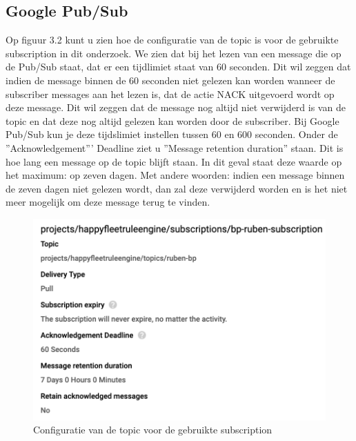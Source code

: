 \subsection{Google Pub/Sub}
Op figuur 3.2 kunt u zien hoe de configuratie van de topic is voor de gebruikte subscription in dit onderzoek. We zien dat bij het lezen van een message die op de Pub/Sub staat, dat er een tijdlimiet staat van 60 seconden. Dit wil zeggen dat indien de message binnen de 60 seconden niet gelezen kan worden wanneer de subscriber messages aan het lezen is, dat de actie NACK uitgevoerd wordt op deze message. Dit wil zeggen dat de message nog altijd niet verwijderd is van de topic en dat deze nog altijd gelezen kan worden door de subscriber. Bij Google Pub/Sub kun je deze tijdslimiet instellen tussen 60 en 600 seconden. Onder de ''Acknowledgement''' Deadline ziet u ''Message retention duration'' staan. Dit is hoe lang een message op de topic blijft staan. In dit geval staat deze waarde op het maximum: op zeven dagen. Met andere woorden: indien een message binnen de zeven dagen niet gelezen wordt, dan zal deze verwijderd worden en is het niet meer mogelijk om deze message terug te vinden.
\begin{figure}[h!]
    \centering
    \includegraphics[width=140mm]{../gpsConfig.png}
    \caption{Configuratie van de topic voor de gebruikte subscription}
    
\end{figure}
